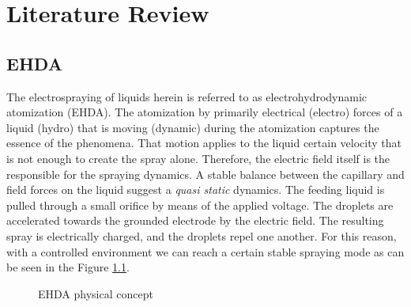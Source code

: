 \chapter{Literature Review}
\label{chap:lit_review}


\section{EHDA}
\label{sec:ehda_resume}

The electrospraying of liquids herein is referred to as electrohydrodynamic atomization (EHDA). The atomization by primarily electrical (electro) forces of a liquid (hydro) that is moving (dynamic) during the atomization captures the essence of the phenomena.\cite{Grace}
That motion applies to the liquid certain velocity that is not enough to create the spray alone. Therefore, the electric field itself is the responsible for the spraying dynamics.\cite{prunet}
A stable balance between the capillary and field forces on the liquid suggest a \emph{quasi static} dynamics.
The feeding liquid is pulled through a small orifice by means of the applied voltage.
The droplets are accelerated towards the grounded electrode by the electric field.
The resulting spray is electrically charged, and the droplets repel one another.
For this reason, with a controlled environment we can reach a certain stable spraying mode as can be seen in the Figure \ref{fig:ehda_setup_ex2}.

\begin{figure}[H]
  \centering
  \caption{EHDA physical concept \cite{Gabriel}}
  \label{fig:ehda_setup_ex2}
\end{figure}


